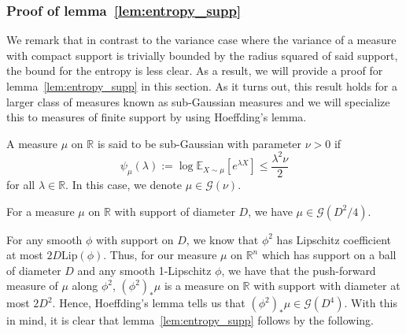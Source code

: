 \subsubsection{Proof of lemma~\ref{lem:entropy_supp}}

We remark that in contrast to the variance case where the variance of a measure with compact 
support is trivially bounded by the radius squared of said support, the bound for the entropy is less 
clear. As a result, we will provide a proof for lemma~\ref{lem:entropy_supp} in this section.
As it turns out, this result holds for a larger class of measures known as sub-Gaussian measures 
and we will specialize this to measures of finite support by using Hoeffding's lemma.

\begin{definition}
  A measure \(\mu\) on \(\mathbb{R}\) is said to be sub-Gaussian with parameter \(\nu > 0\) if 
  \[\psi_\mu(\lambda) := \log \mathbb{E}_{X \sim \mu}[e^{\lambda X}] \le \frac{\lambda^2\nu}{2}\]
  for all \(\lambda \in \mathbb{R}\). In this case, we denote \(\mu \in \mathcal{G}(\nu)\).
\end{definition}



\begin{lemma}
  For a measure \(\mu\) on \(\mathbb{R}\) with support of diameter \(D\), we have \(\mu \in \mathcal{G}(D^2 / 4)\).
\end{lemma}

For any smooth \(\phi\) with support on \(D\), we know that \(\phi^2\) has Lipschitz coefficient 
at most \(2D \text{Lip}(\phi)\). Thus, for our measure \(\mu\) on \(\mathbb{R}^n\) which has support on a ball of diameter \(D\) 
and any smooth 1-Lipschitz \(\phi\), we have that the push-forward measure of \(\mu\) along \(\phi^2\), 
\((\phi^2)_* \mu\) is a measure on \(\mathbb{R}\) with support 
with diameter at most \(2D^2\). Hence, Hoeffding's lemma tells us that \((\phi^2)_* \mu \in \mathcal{G}(D^4)\). 
With this in mind, it is clear that lemma~\ref{lem:entropy_supp} follows by the following.

